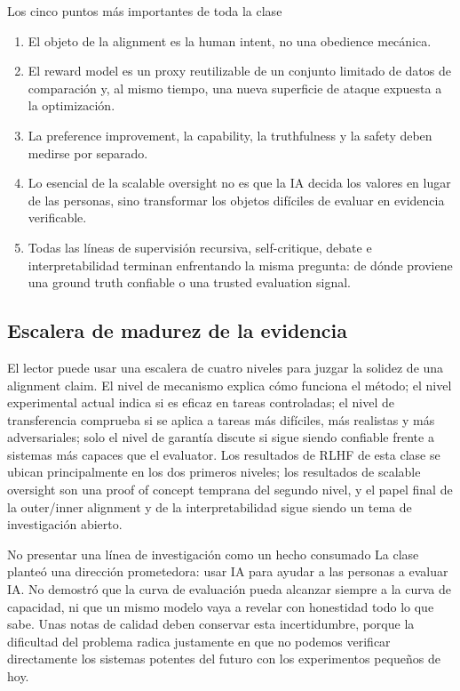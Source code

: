 \documentclass[a4paper]{article}
\begin{document}
\begin{importantbox}{Los cinco puntos más importantes de toda la clase}
\begin{enumerate}
  \item El objeto de la alignment es la human intent, no una obedience mecánica.
  \item El reward model es un proxy reutilizable de un conjunto limitado de datos de comparación y, al mismo tiempo, una nueva superficie de ataque expuesta a la optimización.
  \item La preference improvement, la capability, la truthfulness y la safety deben medirse por separado.
  \item Lo esencial de la scalable oversight no es que la IA decida los valores en lugar de las personas, sino transformar los objetos difíciles de evaluar en evidencia verificable.
  \item Todas las líneas de supervisión recursiva, self-critique, debate e interpretabilidad terminan enfrentando la misma pregunta: de dónde proviene una ground truth confiable o una trusted evaluation signal.
\end{enumerate}
\end{importantbox}

\subsection{Escalera de madurez de la evidencia}

El lector puede usar una escalera de cuatro niveles para juzgar la solidez de una alignment claim. El nivel de mecanismo explica cómo funciona el método; el nivel experimental actual indica si es eficaz en tareas controladas; el nivel de transferencia comprueba si se aplica a tareas más difíciles, más realistas y más adversariales; solo el nivel de garantía discute si sigue siendo confiable frente a sistemas más capaces que el evaluator. Los resultados de RLHF de esta clase se ubican principalmente en los dos primeros niveles; los resultados de scalable oversight son una proof of concept temprana del segundo nivel, y el papel final de la outer/inner alignment y de la interpretabilidad sigue siendo un tema de investigación abierto.

\begin{warningbox}{No presentar una línea de investigación como un hecho consumado}
La clase planteó una dirección prometedora: usar IA para ayudar a las personas a evaluar IA. No demostró que la curva de evaluación pueda alcanzar siempre a la curva de capacidad, ni que un mismo modelo vaya a revelar con honestidad todo lo que sabe. Unas notas de calidad deben conservar esta incertidumbre, porque la dificultad del problema radica justamente en que no podemos verificar directamente los sistemas potentes del futuro con los experimentos pequeños de hoy.
\end{warningbox}
\end{document}
